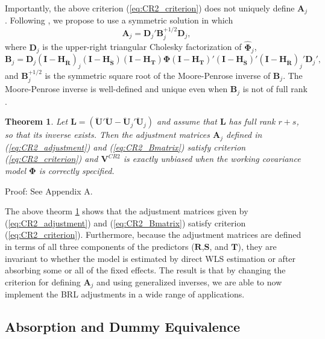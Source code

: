 \documentclass[12pt]{article}
\newtheorem{thm}{Theorem}
\newcommand{\bm}{\mathbf}
\newcommand{\bs}{\boldsymbol}
\begin{document}
Importantly, the above criterion (\ref{eq:CR2_criterion}) does not uniquely define $\bm{A}_j$. Following \citet{McCaffrey2001generalizations}, we propose to use a symmetric solution in which
\begin{equation}
\label{eq:CR2_adjustment}
\bm{A}_j = \bm{D}_j' \bm{B}_j^{+1/2} \bm{D}_j,
\end{equation}
where $\bm{D}_j$ is the upper-right triangular Cholesky factorization of $\hat{\bs\Phi}_j$, 
\begin{equation}
\label{eq:CR2_Bmatrix}
\bm{B}_j = \bm{D}_j\left(\bm{I} - \bm{H_{\ddot{R}}}\right)_j \left(\bm{I} - \bm{H_{\ddot{S}}}\right) \left(\bm{I} - \bm{H_T}\right) \bs\Phi \left(\bm{I} - \bm{H_T}\right)' \left(\bm{I} - \bm{H_{\ddot{S}}}\right)' \left(\bm{I} - \bm{H_{\ddot{R}}}\right)_j' \bm{D}_j',
\end{equation}
and $\bm{B}_j^{+1/2}$ is the symmetric square root of the Moore-Penrose inverse of $\bm{B}_j $. 
The Moore-Penrose inverse is well-defined and unique even when $\bm{B}_j$ is not of full rank \citep[][Thm. 9.18]{Banerjee2014linear}.

\begin{thm}
\label{thm:BRL_FE_intext}
Let $\bm{L} = \left(\bm{\ddot{U}}'\bm{\ddot{U}} - \bm{\ddot{U}}_j'\bm{\ddot{U}}_j\right)$ and assume that $\bm{L}$ has full rank $r + s$, so that its inverse exists. Then the adjustment matrices $\bm{A}_j$ defined in (\ref{eq:CR2_adjustment}) and (\ref{eq:CR2_Bmatrix}) satisfy criterion (\ref{eq:CR2_criterion}) and $\bm{V}^{CR2}$ is exactly unbiased when the working covariance model $\bs\Phi$ is correctly specified.
\end{thm}
Proof: See Appendix A.

The above theorm \ref{thm:BRL_FE_intext} shows that the adjustment matrices given by (\ref{eq:CR2_adjustment}) and (\ref{eq:CR2_Bmatrix}) satisfy criterion (\ref{eq:CR2_criterion}). Furthermore, because the adjustment matrices are defined in terms of all three components of the predictors ($\bm{R}$,$\bm{S}$, and $\bm{T}$), they are invariant to whether the model is estimated by direct WLS estimation or after absorbing some or all of the fixed effects. 
The result is that by changing the criterion for defining $\bm{A}_j$ and using generalized inverses, we are able to now implement the BRL adjustments in a wide range of applications.

\subsection{Absorption and Dummy Equivalence}
\end{document}
